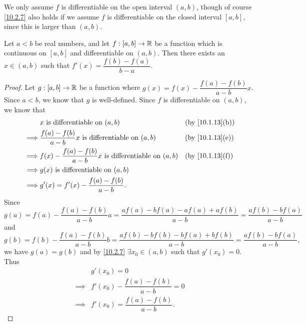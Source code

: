 \begin{rmk}\label{10.2.8}
  We only assume \(f\) is differentiable on the open interval \((a, b)\), though of course \cref{10.2.7} also holds if we assume \(f\) is differentiable on the closed interval \([a, b]\), since this is larger than \((a, b)\).
\end{rmk}

\begin{cor}\label{10.2.9}
  Let \(a < b\) be real numbers, and let \(f : [a, b] \to \mathbb{R}\) be a function which is continuous on \([a, b]\) and differentiable on \((a, b)\).
  Then there exists an \(x \in (a, b)\) such that \(f'(x) = \dfrac{f(b) - f(a)}{b - a}\).
\end{cor}

\begin{proof}
  Let \(g : [a, b] \to \mathbb{R}\) be a function where \(g(x) = f(x) - \dfrac{f(a) - f(b)}{a - b} x\).
  Since \(a < b\), we know that \(g\) is well-defined.
  Since \(f\) is differentiable on \((a, b)\), we know that
  \begin{align*}
             & x \text{ is differentiable on } (a, b)                                   &  & \by{10.1.13}[b] \\
    \implies & \dfrac{f(a) - f(b)}{a - b} x \text{ is differentiable on } (a, b)        &  & \by{10.1.13}[e] \\
    \implies & f(x) - \dfrac{f(a) - f(b)}{a - b} x \text{ is differentiable on } (a, b) &  & \by{10.1.13}[f] \\
    \implies & g(x) \text{ is differentiable on } (a, b)                                                     \\
    \implies & g'(x) = f'(x) - \dfrac{f(a) - f(b)}{a - b}.
  \end{align*}
  Since
  \[
    g(a) = f(a) - \dfrac{f(a) - f(b)}{a - b} a = \dfrac{af(a) - bf(a) - af(a) + af(b)}{a - b} = \dfrac{af(b) - bf(a)}{a - b}
  \]
  and
  \[
    g(b) = f(b) - \dfrac{f(a) - f(b)}{a - b} b = \dfrac{af(b) - bf(b) - bf(a) + bf(b)}{a - b} = \dfrac{af(b) - bf(a)}{a - b},
  \]
  we have \(g(a) = g(b)\) and by \cref{10.2.7} \(\exists x_0 \in (a, b)\) such that \(g'(x_0) = 0\).
  Thus
  \begin{align*}
             & g'(x_0) = 0                              \\
    \implies & f'(x_0) - \dfrac{f(a) - f(b)}{a - b} = 0 \\
    \implies & f'(x_0) = \dfrac{f(a) - f(b)}{a - b}.
  \end{align*}
\end{proof}

